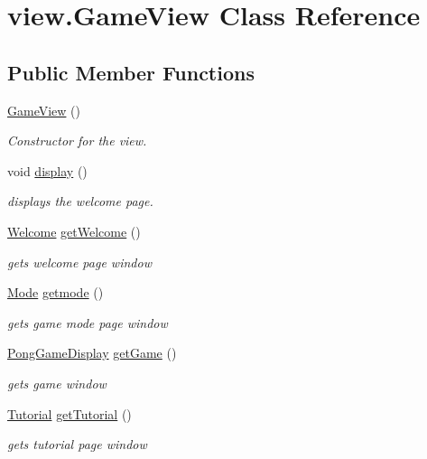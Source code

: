 \hypertarget{classview_1_1_game_view}{}\section{view.\+Game\+View Class Reference}
\label{classview_1_1_game_view}
\subsection*{Public Member Functions}
\begin{DoxyCompactItemize}
\item 
\hyperlink{classview_1_1_game_view_a2405d94a94b047f1858e0ac712983b66}{Game\+View} ()
\begin{DoxyCompactList}\small\item\em Constructor for the view. \end{DoxyCompactList}\item 
void \hyperlink{classview_1_1_game_view_a47f32011f21917818ac92ebecba5dc5b}{display} ()
\begin{DoxyCompactList}\small\item\em displays the welcome page. \end{DoxyCompactList}\item 
\hyperlink{classview_1_1_welcome}{Welcome} \hyperlink{classview_1_1_game_view_adaeb63e182332aee35ca0e0591332add}{get\+Welcome} ()
\begin{DoxyCompactList}\small\item\em gets welcome page window \end{DoxyCompactList}\item 
\hyperlink{classview_1_1_mode}{Mode} \hyperlink{classview_1_1_game_view_a427afb80cd453fd611670936793fb556}{getmode} ()
\begin{DoxyCompactList}\small\item\em gets game mode page window \end{DoxyCompactList}\item 
\hyperlink{classview_1_1_pong_game_display}{Pong\+Game\+Display} \hyperlink{classview_1_1_game_view_ae5dd5521b47a1bdc57e2745ff3b11815}{get\+Game} ()
\begin{DoxyCompactList}\small\item\em gets game window \end{DoxyCompactList}\item 
\hyperlink{classview_1_1_tutorial}{Tutorial} \hyperlink{classview_1_1_game_view_af2d07759d1cde26a4a4d8176baeb0739}{get\+Tutorial} ()
\begin{DoxyCompactList}\small\item\em gets tutorial page window \end{DoxyCompactList}\item 

\end{DoxyCompactItemize}
